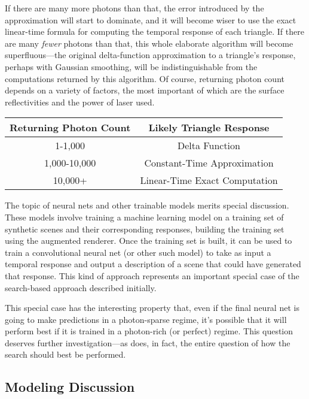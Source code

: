 \documentclass[11pt]{article}
\begin{document}
If there are many more photons than that, the error introduced by the approximation will start to dominate, and it will become wiser to use the exact linear-time formula for computing the temporal response of each triangle. If there are many \emph{fewer} photons than that, this whole elaborate algorithm will become superfluous---the original delta-function approximation to a triangle's response, perhaps with Gaussian smoothing, will be indistinguishable from the computations returned by this algorithm. Of course, returning photon count depends on a variety of factors, the most important of which are the surface reflectivities and the power of laser used.

\begin{center}
    \begin{tabular}{||c c||}
    \hline
    Returning Photon Count & Likely Triangle Response \\ [0.5ex]
    \hline\hline
    1-1,000 & Delta Function \\
    \hline
    1,000-10,000 & Constant-Time Approximation \\ 
    \hline
    10,000+ & Linear-Time Exact Computation \\
    \hline
    \end{tabular}
\end{center}

The topic of neural nets and other trainable models merits special discussion. These models involve training a machine learning model on a training set of synthetic scenes and their corresponding responses, building the training set using the augmented renderer. Once the training set is built, it can be used to train a convolutional neural net (or other such model) to take as input a temporal response and output a description of a scene that could have generated that response. This kind of approach represents an important special case of the search-based approach described initially.

This special case has the interesting property that, even if the final neural net is going to make predictions in a photon-sparse regime, it's possible that it will perform best if it is trained in a photon-rich (or perfect) regime. This question deserves further investigation---as does, in fact, the entire question of how the search should best be performed.

\subsection{Modeling Discussion}
\end{document}
